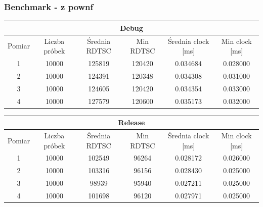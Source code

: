 \documentclass{article}
\begin{document}
	\subsubsection{Benchmark - z pownf}
	\begin{center}
		\begin{tabular}{|c|c|c|c|c|c|} \hline
			\multicolumn{6}{|c|}{Debug} \\\hline
			Pomiar  & Liczba próbek & Średnia RDTSC & Min RDTSC & Średnia clock [ms] & Min clock [ms] \\\hline
			\hline
			1 & 10000 & 125819 & 120420 & 0.034684 & 0.028000 \\\hline
			2 & 10000 & 124391 & 120348 & 0.034308 & 0.031000 \\\hline
			3 & 10000 & 124605 & 120420 & 0.034354 & 0.033000 \\\hline
			4 & 10000 & 127579 & 120600 & 0.035173 & 0.032000 \\\hline
			
		\end{tabular}
	\end{center}
	\begin{center}
		\begin{tabular}{|c|c|c|c|c|c|} \hline
			\multicolumn{6}{|c|}{Release} \\\hline
			Pomiar  & Liczba próbek & Średnia RDTSC & Min RDTSC & Średnia clock [ms] & Min clock [ms] \\\hline
			\hline
			1 & 10000 & 102549 & 96264 & 0.028172 & 0.026000 \\\hline
			2 & 10000 & 103316 & 96156 & 0.028430 & 0.025000 \\\hline
			3 & 10000 & 98939 & 95940 & 0.027211 & 0.025000 \\\hline
			4 & 10000 & 101698 & 96120 & 0.027971 & 0.025000 \\\hline
			
		\end{tabular}
	\end{center}
	
\end{document}
